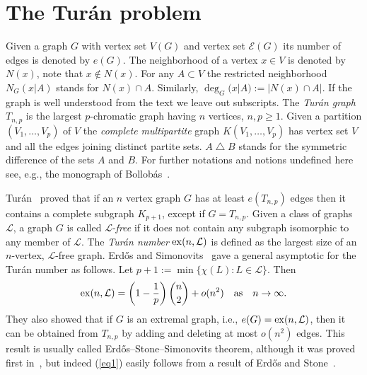 \documentclass[11pt]{article}
\def\ex{{\rm ex}}
\def\EE{{\mathcal E}}
\def\LL{{\mathcal L}}
\begin{document}
\section{The Tur\'an problem} %


Given a graph $G$ with vertex set $V(G)$ and vertex set $\EE(G)$ its number of edges is denoted by $e(G)$.
The neighborhood of a vertex $x\in V$ is denoted by $N(x)$, note that $x\notin N(x)$.
For any $A\subset V$ the restricted neighborhood $N_G(x|A)$ stands for $N(x)\cap A$.
Similarly, $\deg_G(x|A):=|N(x)\cap A|$.
If the graph is well understood from the text we leave out subscripts.
The {\it Tur\'an graph} $T_{n,p}$ is the largest $p$-chromatic graph having $n$ vertices, $n,p\geq 1$.
Given a partition $(V_1, \dots, V_p)$ of $V$ the {\it complete multipartite} graph
 $K(V_1, \dots, V_p)$ has vertex set $V$ and all the edges joining distinct partite sets.
$A\bigtriangleup B$ stands for the symmetric difference of the sets $A$ and $B$.
For further notations and notions undefined here see, e.g., the monograph of Bollob\'as~\cite{BolExt}.

Tur\'an~\cite{TuranA} proved that if an $n$ vertex graph $G$ has at least
 $e(T_{n,p})$ edges then it contains a complete subgraph $K_{p+1}$, except if $G=T_{n,p}$.
Given a class of graphs $\LL$, a graph $G$ is called $\LL$-{\it free} if it does not contain any subgraph isomorphic to any member of $\LL$.
The {\it Tur\'an number} $\ex(n,\LL)$ is defined as the largest size of an $n$-vertex, $\LL$-free graph.
Erd\H os and Simonovits~\cite{ErdSimLim} gave a general asymptotic for the Tur\'an number as follows.
Let $p+1:=\min \{\chi(L): L\in\LL\}$. Then
\begin{equation}\label{eq1}
\ex(n,\LL)=\left(1-\frac{1}{p}\right)\binom{n}{2}+o(n^2) \quad{\rm as} \quad n\to \infty.
  \end{equation}
They also showed that if $G$ is an extremal graph, i.e., $e(G)=\ex(n, \LL)$,
 then it can be obtained from $T_{n,p}$ by adding and deleting at most $o(n^2)$ edges.
This result is usually called Erd\H os--Stone--Simonovits theorem, although it was proved first in~\cite{ErdSimLim},
 but indeed (\ref{eq1}) easily follows from a result of Erd\H os and Stone~\cite{ErdStone}.
\end{document}
